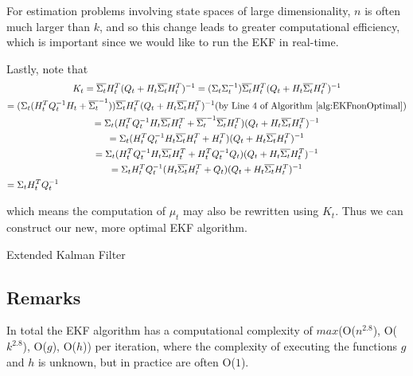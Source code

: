 For estimation problems involving state spaces of large dimensionality, \(n\) is often much larger than \(k\), and so this change leads to greater computational efficiency, which is important since we would like to run the EKF in real-time.

Lastly, note that
\begin{multline}
K_t = \overline{\Sigma_t} H_t^T (Q_t + H_t \overline{\Sigma_t} H_t^T)^{-1} = (\Sigma_t \Sigma_t^{-1}) \overline{\Sigma_t} H_t^T (Q_t + H_t \overline{\Sigma_t} H_t^T)^{-1} \\
= (\Sigma_t (H_t^T Q_t^{-1} H_t + \overline{\Sigma_t}^{-1})) \overline{\Sigma_t} H_t^T (Q_t + H_t \overline{\Sigma_t} H_t^T)^{-1} \hfill \text{(by Line 4 of Algorithm \ref{alg:EKFnonOptimal})} \\
= \Sigma_t (H_t^T Q_t^{-1} H_t \overline{\Sigma_t} H_t^T + \overline{\Sigma_t}^{-1} \overline{\Sigma_t} H_t^T) (Q_t + H_t \overline{\Sigma_t} H_t^T)^{-1} \\
= \Sigma_t (H_t^T Q_t^{-1} H_t \overline{\Sigma_t} H_t^T + H_t^T) (Q_t + H_t \overline{\Sigma_t} H_t^T)^{-1} \\
= \Sigma_t (H_t^T Q_t^{-1} H_t \overline{\Sigma_t} H_t^T + H_t^T Q_t^{-1} Q_t) (Q_t + H_t \overline{\Sigma_t} H_t^T)^{-1} \\
= \Sigma_t H_t^T Q_t^{-1} ( H_t \overline{\Sigma_t} H_t^T + Q_t) (Q_t + H_t \overline{\Sigma_t} H_t^T)^{-1} \\
= \Sigma_t H_t^T Q_t^{-1} \hfill
\end{multline}

which means the computation of \(\mu_t\) may also be rewritten using \(K_t\). Thus we can construct our new, more optimal EKF  algorithm.
\begin{algorithm} 
	\caption{Extended Kalman Filter}
	\label{alg:EKFOptimal}
	\begin{algorithmic}[1]
		\State {}
		\EndFunction
	\end{algorithmic}
\end{algorithm}

\subsection{Remarks}
In total the EKF algorithm has a computational complexity of \(max\)(O(\(n^{2.8}\)), O(\(k^{2.8}\)), O(\(g\)), O(\(h\))) per iteration, where the complexity of executing the functions \(g\) and \(h\) is unknown, but in practice are often O(\(1\)).

